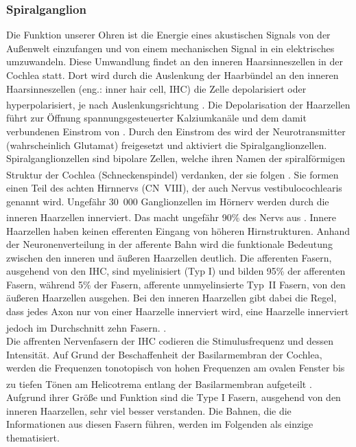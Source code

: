 \documentclass[12pt,a4paper,pdftex]{article}
\begin{document}
\subsubsection*{Spiralganglion}
Die Funktion unserer Ohren ist die Energie eines akustischen Signals von der Außenwelt einzufangen und von einem mechanischen Signal in ein elektrisches umzuwandeln. Diese Umwandlung findet an den inneren Haarsinneszellen in der Cochlea statt. Dort wird durch die Auslenkung der Haarbündel an den inneren Haarsinneszellen (eng.: inner hair cell, IHC)  die Zelle depolarisiert oder hyperpolarisiert, je nach Auslenkungsrichtung \textsuperscript{\cite[30]{kandel2013principles}}. Die Depolarisation der Haarzellen führt zur Öffnung spannungsgesteuerter Kalziumkanäle und dem damit verbundenen Einstrom von . Durch den Einstrom des  wird der Neurotransmitter (wahrscheinlich Glutamat) freigesetzt und aktiviert die Spiralganglionzellen. Spiralganglionzellen sind bipolare Zellen, welche ihren Namen der spiralförmigen Struktur der Cochlea (Schneckenspindel)  verdanken, der sie folgen \textsuperscript{\cite[11]{neurowissenschaften_baer}}. Sie formen einen Teil des achten Hirnnervs (CN~VIII), der auch Nervus vestibulocochlearis  genannt wird. Ungefähr 30~000 Ganglionzellen im Hörnerv werden durch die inneren Haarzellen innerviert. Das macht ungefähr 90\% des Nervs aus \textsuperscript{\cite[30]{kandel2013principles}}. 
Innere Haarzellen haben keinen efferenten Eingang von höheren Hirnstrukturen. Anhand der Neuronenverteilung in der afferente Bahn wird die funktionale Bedeutung zwischen den inneren und äußeren Haarzellen deutlich. Die afferenten Fasern, ausgehend von den IHC, sind myelinisiert (Typ I) und bilden 95\% der afferenten Fasern, während 5\% der Fasern, afferente unmyelinsierte Typ~II Fasern, von den äußeren Haarzellen ausgehen. Bei den inneren Haarzellen gibt dabei die Regel, dass jedes Axon nur von einer Haarzelle innerviert wird, eine Haarzelle innerviert jedoch im Durchschnitt zehn Fasern.  \textsuperscript{\cite[30]{kandel2013principles}}.   
\\
\noindent Die affrenten Nervenfasern der IHC codieren die Stimulusfrequenz und dessen Intensität. Auf Grund der Beschaffenheit der Basilarmembran  der Cochlea, werden die Frequenzen tonotopisch von hohen Frequenzen am ovalen Fenster bis zu tiefen Tönen am Helicotrema  entlang der Basilarmembran aufgeteilt \textsuperscript{\cite[22]{paxinos2014rat}}. Aufgrund ihrer Größe und Funktion sind die Type I Fasern, ausgehend von den inneren Haarzellen, sehr viel besser verstanden. Die Bahnen, die die Informationen aus diesen Fasern führen, werden im Folgenden als einzige thematisiert.
\end{document}
